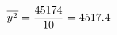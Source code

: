 \documentclass[preview]{standalone}
\begin{document}
\begin{align*}
\special{dvisvgm:raw <g id='unique000'>}\overline{y^2} = \frac{45174}{10} = 4517.4\special{dvisvgm:raw </g>}
\end{align*}
\end{document}
